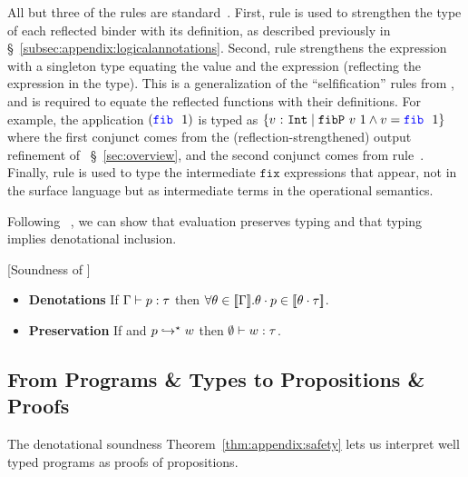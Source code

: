 %
All but three of the rules are standard~\cite{Knowles10,Vazou14}.
%
First, rule \rtreflect is used to strengthen the type of each
reflected binder with its definition, as described previously
in \S~\ref{subsec:appendix:logicalannotations}.
%
Second, rule \rtexact strengthens the expression with
a singleton type equating the value and the expression
(\ie reflecting the expression in the type).
%
This is a generalization of the ``selfification'' rules
from \cite{Ou2004,Knowles10}, and is required to
equate the reflected functions with their definitions.
%
For example, the application $(\fib\ 1)$ is typed as
${\tref{v}{\tint}{\fibdef\ v\ 1 \wedge v = \fib\ 1}}$ where
the first conjunct comes from the (reflection-strengthened)
output refinement of \fib~\S~\ref{sec:overview}, and
the second conjunct comes from rule~\rtexact.
%
Finally, rule \rtfix is used to type the intermediate
$\texttt{fix}$ expressions that appear, not in the
surface language but as intermediate terms in the
operational semantics.

Following \undeclang~\citep{Vazou14}, we can show that
evaluation preserves typing and that typing implies
denotational inclusion.
%
\begin{theorem}{[Soundness of \corelan]}\label{thm:appendix:safety}
\begin{itemize}
\item\textbf{Denotations}
If $\Gamma \vdash p : \tau$ then
$\forall \theta\in [\![\Gamma]\!]. {\theta} \cdot {\ensuremath{p}}  \in [\![{\theta} \cdot {\ensuremath{\tau}} ]\!]$.
\item\textbf{Preservation}
If \hastype{\emptyset}{\prog}{\typ}
       and ${p}\hookrightarrow^{\star}{w}$ then $\emptyset \vdash w : \tau$.
\end{itemize}
\end{theorem}

\subsection{From Programs \& Types to Propositions \& Proofs}

The denotational soundness Theorem~\ref{thm:appendix:safety}
lets us interpret well typed programs as proofs of
propositions.

